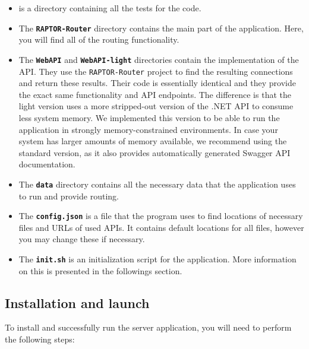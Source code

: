 \begin{itemize}
    \item {} is a directory containing all the tests for the code.
    \item The \textbf{\texttt{RAPTOR-Router}} directory contains the main part of the application. Here, you will find all of the routing functionality.
    \item The \textbf{\texttt{WebAPI}} and \textbf{\texttt{WebAPI-light}} directories contain the implementation of the API. They use the \texttt{RAPTOR-Router} project to find the resulting connections and return these results. Their code is essentially identical and they provide the exact same functionality and API endpoints. The difference is that the light version uses a more stripped-out version of the .NET API to consume less system memory. We implemented this version to be able to run the application in strongly memory-constrained environments. In case your system has larger amounts of memory available, we recommend using the standard version, as it also provides automatically generated Swagger API documentation.
    \item The \textbf{\texttt{data}} directory contains all the necessary data that the application uses to run and provide routing.
    \item The \textbf{\texttt{config.json}} is a file that the program uses to find locations of necessary files and URLs of used APIs. It contains default locations for all files, however you may change these if necessary.
    \item The \textbf{\texttt{init.sh}} is an initialization script for the application. More information on this is presented in the followings section.
\end{itemize}

\subsection{Installation and launch}

To install and successfully run the server application, you will need to perform the following steps:

